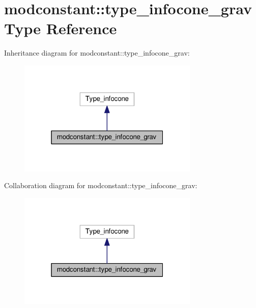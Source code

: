 \hypertarget{structmodconstant_1_1type__infocone__grav}{\section{modconstant\-:\-:type\-\_\-infocone\-\_\-grav Type Reference}
\label{structmodconstant_1_1type__infocone__grav}
}


Inheritance diagram for modconstant\-:\-:type\-\_\-infocone\-\_\-grav\-:\nopagebreak
\begin{figure}[H]
\begin{center}
\leavevmode
\includegraphics[width=244pt]{structmodconstant_1_1type__infocone__grav__inherit__graph}
\end{center}
\end{figure}


Collaboration diagram for modconstant\-:\-:type\-\_\-infocone\-\_\-grav\-:\nopagebreak
\begin{figure}[H]
\begin{center}
\leavevmode
\includegraphics[width=244pt]{structmodconstant_1_1type__infocone__grav__coll__graph}
\end{center}
\end{figure}
